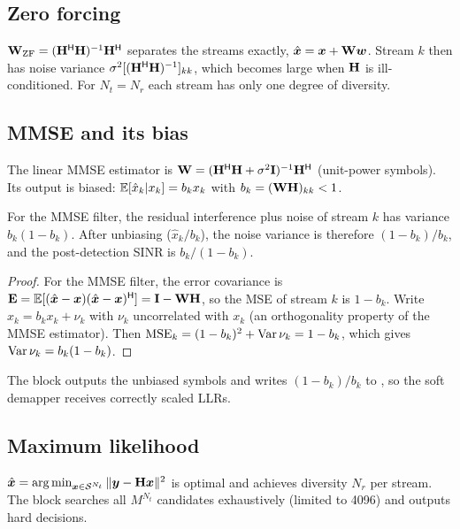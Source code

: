 \subsection{Zero forcing}
$\mathbf{W}_{\mathrm{ZF}}=(\mathbf{H}^{\mathsf{H}}\mathbf{H})^{-1}\mathbf{H}^{\mathsf{H}}$ separates the streams exactly,
$\hat{\bm{x}}=\bm{x}+\mathbf{W}\bm{w}$. Stream $k$ then has noise variance
$\sigma^2[(\mathbf{H}^{\mathsf{H}}\mathbf{H})^{-1}]_{kk}$, which becomes large when $\mathbf{H}$ is ill-conditioned. For
$N_t=N_r$ each stream has only one degree of diversity.

\subsection{MMSE and its bias}
The linear MMSE estimator is $\mathbf{W}=(\mathbf{H}^{\mathsf{H}}\mathbf{H}+\sigma^2\mathbf{I})^{-1}\mathbf{H}^{\mathsf{H}}$ (unit-power
symbols). Its output is biased: $\mathbb{E}[\hat x_k|x_k]=b_kx_k$ with $b_k=(\mathbf{W}\mathbf{H})_{kk}<1$.
\begin{proposition}
For the MMSE filter, the residual interference plus noise of stream $k$ has variance
$b_k(1-b_k)$. After unbiasing ($\hat x_k/b_k$), the noise variance is therefore $(1-b_k)/b_k$,
and the post-detection SINR is $b_k/(1-b_k)$.
\end{proposition}
\begin{proof}
For the MMSE filter, the error covariance is
$\mathbf{E}=\mathbb{E}[(\hat{\bm{x}}-\bm{x})(\hat{\bm{x}}-\bm{x})^{\mathsf{H}}]=\mathbf{I}-\mathbf{W}\mathbf{H}$, so the MSE of
stream $k$ is $1-b_k$. Write $\hat x_k=b_kx_k+\nu_k$ with $\nu_k$ uncorrelated with $x_k$ (an
orthogonality property of the MMSE estimator). Then
$\mathrm{MSE}_k=(1-b_k)^2+\operatorname{Var}\nu_k=1-b_k$, which gives $\operatorname{Var}\nu_k=b_k(1-b_k)$.
\end{proof}
The block outputs the unbiased symbols and writes $(1-b_k)/b_k$ to , so the
soft demapper receives correctly scaled LLRs.

\subsection{Maximum likelihood}
$\hat{\bm{x}}=\operatorname*{arg\,min}_{\bm{x}\in\mathcal S^{N_t}}\|\bm{y}-\mathbf{H}\bm{x}\|^2$ is optimal and
achieves diversity $N_r$ per stream. The block searches all $M^{N_t}$ candidates exhaustively
(limited to 4096) and outputs hard decisions.

